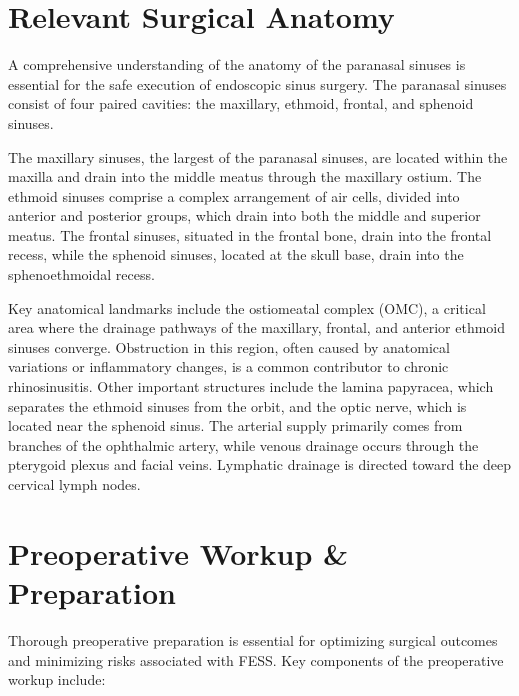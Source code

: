 \section*{Relevant Surgical Anatomy}
A comprehensive understanding of the anatomy of the paranasal sinuses is essential for the safe execution of endoscopic sinus surgery. The paranasal sinuses consist of four paired cavities: the maxillary, ethmoid, frontal, and sphenoid sinuses. 

The maxillary sinuses, the largest of the paranasal sinuses, are located within the maxilla and drain into the middle meatus through the maxillary ostium. The ethmoid sinuses comprise a complex arrangement of air cells, divided into anterior and posterior groups, which drain into both the middle and superior meatus. The frontal sinuses, situated in the frontal bone, drain into the frontal recess, while the sphenoid sinuses, located at the skull base, drain into the sphenoethmoidal recess.

Key anatomical landmarks include the ostiomeatal complex (OMC), a critical area where the drainage pathways of the maxillary, frontal, and anterior ethmoid sinuses converge. Obstruction in this region, often caused by anatomical variations or inflammatory changes, is a common contributor to chronic rhinosinusitis. Other important structures include the lamina papyracea, which separates the ethmoid sinuses from the orbit, and the optic nerve, which is located near the sphenoid sinus. The arterial supply primarily comes from branches of the ophthalmic artery, while venous drainage occurs through the pterygoid plexus and facial veins. Lymphatic drainage is directed toward the deep cervical lymph nodes.

\section*{Preoperative Workup \& Preparation}
Thorough preoperative preparation is essential for optimizing surgical outcomes and minimizing risks associated with FESS. Key components of the preoperative workup include:

